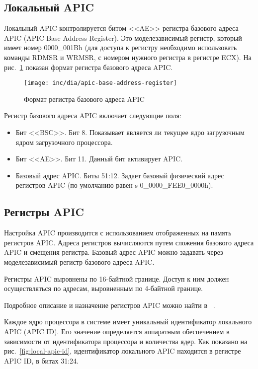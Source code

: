 \subsection{Локальный APIC}
Локальный APIC контролируется битом <<AE>> регистра базового адреса APIC (APIC Base Address Register).
Это моделезависимый регистр, который имеет номер 0000\_001Bh (для доступа к регистру необходимо
использовать команды RDMSR и WRMSR, с номером нужного регистра в регистре ECX).
На рис.~\ref{fig:apic-base-address-register} показан формат регистра базового адреса APIC.

\begin{figure}[ht!]
  \centering
  \texttt{[image: inc/dia/apic-base-address-register]}
  \caption{Формат регистра базового адреса APIC}
  \label{fig:apic-base-address-register}
\end{figure}

Регистр базового адреса APIC включает следующие поля:
\begin{itemize}
\item Бит <<BSC>>. Бит 8. Показывает является ли текущее ядро загрузочным ядром загрузочного процессора.
\item Бит <<AE>>. Бит 11. Данный бит активирует APIC.
\item Базовый адрес APIC. Биты 51:12. Задает базовый физический адрес регистров APIC (по умолчанию
	равен s 0\_0000\_FEE0\_0000h).
\end{itemize}

\subsection{Регистры APIC}
Настройка APIC производится с использованием отображенных на память регистров APIC.
Адреса регистров вычисляются путем сложения базового адреса APIC и смещения регистра.
Базовый адрес APIC можно задавать через моделезависимый регистр базового адреса APIC.

Регистры APIC выровнены по 16-байтной границе. Доступ к ним должен осуществляться
по адресам, выровненным по 4-байтной границе.

Подробное описание и назначение регистров APIC можно найти в ~\cite{amd_pm_v2}.

Каждое ядро процессора в системе имеет уникальный идентификатор локального APIC (APIC ID).
Его значение определяется аппаратным обеспечением в зависимости от идентификатора процессора
и количества ядер. Как показано на рис.~\ref{fig:local-apic-id}, идентификатор локального APIC
находится в регистре APIC ID, в битах 31:24.


